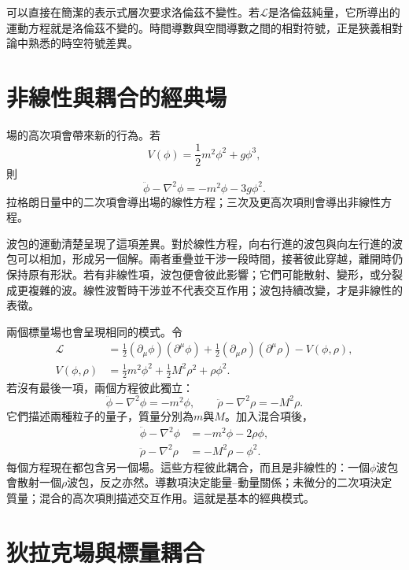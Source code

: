 可以直接在簡潔的表示式層次要求洛倫茲不變性。若\(\mathcal L\)是洛倫茲純量，它所導出的運動方程就是洛倫茲不變的。時間導數與空間導數之間的相對符號，正是狹義相對論中熟悉的時空符號差異。

\section{非線性與耦合的經典場}

場的高次項會帶來新的行為。若
\begin{equation}
V(\phi)=\frac12m^2\phi^2+g\phi^3,
\end{equation}
則
\begin{equation}
\ddot\phi-\nabla^2\phi=-m^2\phi-3g\phi^2.
\end{equation}
拉格朗日量中的二次項會導出場的線性方程；三次及更高次項則會導出非線性方程。

波包的運動清楚呈現了這項差異。對於線性方程，向右行進的波包與向左行進的波包可以相加，形成另一個解。兩者重疊並干涉一段時間，接著彼此穿越，離開時仍保持原有形狀。若有非線性項，波包便會彼此影響；它們可能散射、變形，或分裂成更複雜的波。線性波暫時干涉並不代表交互作用；波包持續改變，才是非線性的表徵。

兩個標量場也會呈現相同的模式。令
\begin{align}
\mathcal L
&=
\frac12(\partial_\mu\phi)(\partial^\mu\phi)
+\frac12(\partial_\mu\rho)(\partial^\mu\rho)
-V(\phi,\rho),
\\
V(\phi,\rho)
&=
\frac12m^2\phi^2+\frac12M^2\rho^2+\rho\phi^2.
\end{align}
若沒有最後一項，兩個方程彼此獨立：
\begin{equation}
\ddot\phi-\nabla^2\phi=-m^2\phi,
\qquad
\ddot\rho-\nabla^2\rho=-M^2\rho.
\end{equation}
它們描述兩種粒子的量子，質量分別為\(m\)與\(M\)。加入混合項後，
\begin{align}
\ddot\phi-\nabla^2\phi&=-m^2\phi-2\rho\phi,
\\
\ddot\rho-\nabla^2\rho&=-M^2\rho-\phi^2.
\end{align}
每個方程現在都包含另一個場。這些方程彼此耦合，而且是非線性的：一個\(\phi\)波包會散射一個\(\rho\)波包，反之亦然。導數項決定能量--動量關係；未微分的二次項決定質量；混合的高次項則描述交互作用。這就是基本的經典模式。

\section{狄拉克場與標量耦合}

